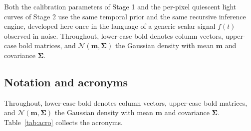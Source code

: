 \documentclass[11pt]{article}
\newcommand{\Norm}{\mathcal{N}}
\begin{document}
Both the calibration parameters of Stage 1 and the per-pixel quiescent light curves of Stage 2 use
the same temporal prior and the same recursive inference engine, developed here once in the
language of a generic scalar signal $f(t)$ observed in noise. Throughout, lower-case bold denotes
column vectors, upper-case bold matrices, and $\Norm(\bm{m},\bm{\Sigma})$ the Gaussian density with
mean $\bm{m}$ and covariance $\bm{\Sigma}$.

\subsection{Notation and acronyms}


Throughout, lower-case bold denotes column vectors, upper-case bold matrices, and
$\Norm(\bm{m},\bm{\Sigma})$ the Gaussian density with mean $\bm{m}$ and covariance
$\bm{\Sigma}$. Table~\ref{tab:acro} collects the acronyms.
\end{document}
